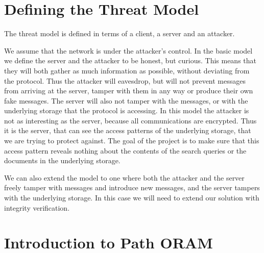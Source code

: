 \documentclass[12pt,a4paper,twoside,openright]{report}
\begin{document}






\section{Defining the Threat Model}
\label{sec:threatmodel}

The threat model is defined in terms of a client, a server and an attacker.

We assume that the network is under the attacker's control. In the basic model we define the server and the attacker to be honest, but curious. This means that they will both gather as much information as possible, without deviating from the protocol. Thus the attacker will eavesdrop, but will not prevent messages from arriving at the server, tamper with them in any way or produce their own fake messages. The server will also not tamper with the messages, or with the underlying storage that the protocol is accessing. In this model the attacker is not as interesting as the server, because all communications are encrypted. Thus it is the server, that can see the access patterns of the underlying storage, that we are trying to protect against. The goal of the project is to make sure that this access pattern reveals nothing about the contents of the search queries or the documents in the underlying storage.

We can also extend the model to one where both the attacker and the server freely tamper with messages and introduce new messages, and the server tampers with the underlying storage. In this case we will need to extend our solution with integrity verification.

\section{Introduction to Path ORAM}
\label{sec:oramintro}
\end{document}
